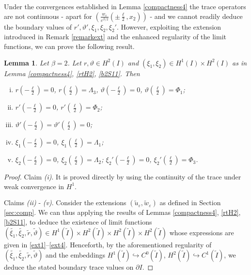 \documentclass[a4, 11pt, reqno, final]{amsart}
\newcommand\embed{\hookrightarrow} %
\newcommand\e{\varepsilon}
\theoremstyle{plain}%
\newtheorem{lemma}[theorem]{Lemma}
\newcommand{\QED}{\hspace{1ex}\hfill$\blacksquare$\vspace{2ex}}
\begin{document}
	Under the convergences established in Lemma \ref{compactness4} the trace operators are not continuous - apart for $(\frac{w_\e}{\e^{\beta/2}}(\pm \frac{\ell}{2}, x_2))$ - and we cannot readily deduce the boundary values of $r', \vartheta', \xi_1, \xi_2, \xi_2'$. However, exploiting the extension introduced in Remark \ref{remarkext} and the enhanced regularity of the limit functions, we can prove the following result.
	\begin{lemma}
		Let $\beta=2$. Let $r,\vartheta \in H^2(I)$ and $(\xi_1, \xi_2) \in H^1(I)\times H^2(I)$ as in Lemma \ref{compactness4}, \ref{rtH2}, \ref{b2S11}. Then
		\begin{enumerate}[(i)]
			\item $r(-\frac{\ell}{2}) = 0$, $r(\frac{\ell}{2}) = \Lambda_3$, $\vartheta(-\frac{\ell}{2}) = 0$, $\vartheta(\frac{\ell}{2}) = \Phi_1$;
			\item $r'(-\frac{\ell}{2})=0$, $r'(\frac{\ell}{2}) = \Phi_2$;
			\item $\vartheta'(-\frac{\ell}{2}) = \vartheta'(\frac{\ell}{2})=0$;
			\item $\xi_1(-\frac{\ell}{2})=0$, $\xi_1(\frac{\ell}{2}) = \Lambda_1$;
			\item $\xi_2(-\frac{\ell}{2})=0$, $\xi_2(\frac{\ell}{2})=\Lambda_2$; $\xi_2'(-\frac{\ell}{2})=0$, $\xi_2'(\frac{\ell}{2})=\Phi_3$.
		\end{enumerate}
	\end{lemma}
	\begin{proof}
		Claim \textit{(i)}. It is proved directly by using the continuity of the trace under weak convergence in $H^1$.

		Claims \textit{(ii)} - \textit{(v)}.
		Consider the extensions $(\widetilde{u}_\e, \widetilde{w}_\e)$ as defined in Section \ref{sec:comp}.
		We can thus applying the results of Lemmas \ref{compactness4}, \ref{rtH2}, \ref{b2S11}, to deduce the existence of limit functions $(\widetilde{\xi_1}, \widetilde{\xi_2}, \widetilde{r}, \widetilde{\vartheta}) \in H^1(\widetilde{I})\times H^2(\widetilde{I}) \times H^2(\widetilde{I}) \times H^2(\widetilde{I})$ whose expressions are given in \eqref{ext1}--\eqref{ext4}.
		Henceforth, by the aforementioned regularity of $(\widetilde{\xi_1}, \widetilde{\xi_2}, \widetilde{r}, \widetilde{\vartheta})$ and the embeddings $H^1(\widetilde{I}) \embed C^0(\widetilde{I})$, $H^2(\widetilde{I}) \embed C^1(\widetilde{I})$, we deduce the stated boundary trace values on $\partial I$.
	\end{proof}
\end{document}
